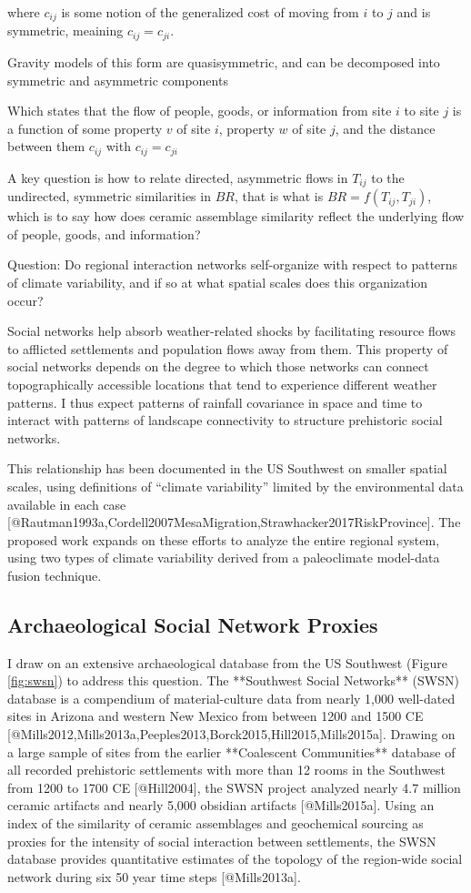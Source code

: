 \documentclass[fleqn,10pt]{wlscirep}
\begin{document}
where $c_{ij}$ is some notion of the generalized cost of moving from $i$ to $j$ and is symmetric, meaining $c_{ij} = c_{ji}$.

Gravity models of this form are quasisymmetric, and can be decomposed into symmetric and asymmetric components


Which states that the flow of people, goods, or information from site $i$ to site $j$ is a function of some property $v$ of site $i$, property $w$ of site $j$, and the distance between them $c_{ij}$ with $c_{ij} = c_{ji}$

A key question is how to relate directed, asymmetric flows in $T_{ij}$ to the undirected, symmetric similarities in $BR$, that is what is $BR = f(T_{ij},T_{ji})$, which is to say how does ceramic assemblage similarity reflect the underlying flow of people, goods, and information?


Question: Do regional interaction networks self-organize with respect to patterns of climate variability, and if so at what spatial scales does this organization occur?

Social networks help absorb weather-related shocks by facilitating resource flows to afflicted settlements and population flows away from them. This property of social networks depends on the degree to which those networks can connect topographically accessible locations that tend to experience different weather patterns. I thus expect patterns of rainfall covariance in space and time to interact with patterns of landscape connectivity to structure prehistoric social networks.

This relationship has been documented in the US Southwest on smaller spatial scales, using definitions of ``climate variability'' limited by the environmental data available in each case [@Rautman1993a,Cordell2007MesaMigration,Strawhacker2017RiskProvince]. The proposed work expands on these efforts to analyze the entire regional system, using two types of climate variability derived from a paleoclimate model-data fusion technique.

\subsection*{Archaeological Social Network Proxies}

I draw on an extensive archaeological database from the US Southwest (Figure \ref{fig:swsn}) to address this question. The **Southwest Social Networks** (SWSN) database is a compendium of material-culture data from nearly 1,000 well-dated sites in Arizona and western New Mexico from between 1200 and 1500 CE [@Mills2012,Mills2013a,Peeples2013,Borck2015,Hill2015,Mills2015a]. Drawing on a large sample of sites from the earlier **Coalescent Communities** database of all recorded prehistoric settlements with more than 12 rooms in the Southwest from 1200 to 1700 CE [@Hill2004], the SWSN project analyzed nearly 4.7 million ceramic artifacts and nearly 5,000 obsidian artifacts [@Mills2015a]. Using an index of the similarity of ceramic assemblages and geochemical sourcing as proxies for the intensity of social interaction between settlements, the SWSN database provides quantitative estimates of the topology of the region-wide social network during six 50 year time steps [@Mills2013a].
\end{document}
